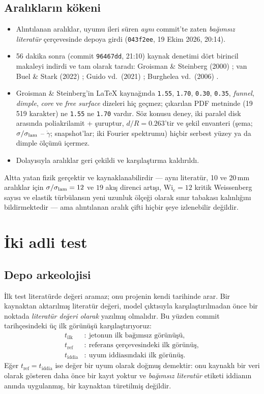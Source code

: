 \documentclass[11pt,a4paper]{article}
\begin{document}
\subsection{Aralıkların kökeni}
\begin{itemize}
    \item Alıntılanan aralıklar, uyumu ileri süren \emph{aynı} commit'te
    zaten \emph{bağımsız literatür} çerçevesinde depoya girdi
    (\texttt{043f2ee}, 19 Ekim 2026, 20:14).
    \item 56 dakika sonra (commit \texttt{96467dd}, 21:10) kaynak denetimi
    dört birincil makaleyi indirdi ve tam olarak taradı: Groisman \& Steinberg
    (2000) \cite{gs2000}; van Buel \& Stark (2022) \cite{vbs2022}; Guido vd.\
    (2021) \cite{guido2021}; Burghelea vd.\ (2006) \cite{bss2006}.
    \item Groisman \& Steinberg'in LaTeX kaynağında \texttt{1.55},
    \texttt{1.70}, \texttt{0.30}, \texttt{0.35}, \emph{funnel},
    \emph{dimple}, \emph{core} ve \emph{free surface} dizeleri hiç geçmez;
    çıkarılan PDF metninde (19\,519 karakter) ne \texttt{1.55} ne
    \texttt{1.70} vardır. Söz konusu deney, iki paralel disk arasında
    poliakrilamit + şuruptur, $d/R = 0.263$'tir ve şekil envanteri (şema;
    $\sigma/\sigma_{\rm lam}$ -- $\dot\gamma$; snapshot'lar; iki Fourier
    spektrumu) hiçbir serbest yüzey ya da dimple ölçümü içermez.
    \item Dolayısıyla aralıklar geri çekildi ve karşılaştırma kaldırıldı.
\end{itemize}
Altta yatan fizik gerçektir ve kaynaklanabilirdir --- aynı literatür, 10 ve
20\,mm aralıklar için $\sigma/\sigma_{\rm lam} = 12$ ve $19$ akış direnci
artışı, $\mathrm{Wi}_c = 12$ kritik Weissenberg sayısı ve elastik
türbülansın yeni uzunluk ölçeği olarak sınır tabakası kalınlığını
bildirmektedir --- ama alıntılanan aralık çifti hiçbir şeye izlenebilir
değildir.

\section{İki adli test}
\subsection{Depo arkeolojisi}
İlk test literatürde değeri aramaz; onu projenin kendi tarihinde arar. Bir
kaynaktan aktarılmış literatür değeri, model çıktısıyla karşılaştırılmadan
önce bir noktada \emph{literatür değeri olarak} yazılmış olmalıdır. Bu
yüzden commit tarihçesindeki üç ilk görünüşü karşılaştırıyoruz:
\begin{align}
t_{\mathrm{ilk}} &:\ \text{jetonun ilk bağımsız görünüşü},\\
t_{\mathrm{ref}} &:\ \text{referans çerçevesindeki ilk görünüş},\\
t_{\mathrm{iddia}} &:\ \text{uyum iddiasındaki ilk görünüş}.
\end{align}
Eğer $t_{\mathrm{ref}} = t_{\mathrm{iddia}}$ ise değer bir uyum olarak doğmuş
demektir: onu kaynaklı bir veri olarak gösteren daha önce bir kayıt yoktur ve
\emph{bağımsız literatür} etiketi iddianın anında uygulanmış, bir kaynaktan
türetilmiş değildir.
\end{document}
